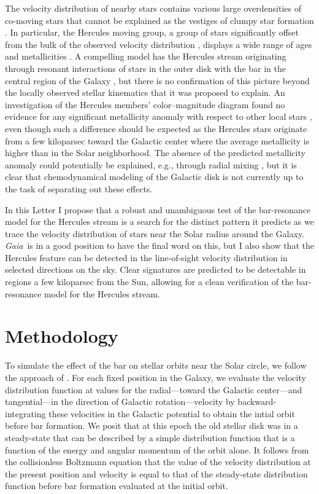 \documentclass[12pt,preprint]{aastex}
\newcommand{\eg}{e.g.}
\newcommand{\Gaia}{\emph{Gaia}}
\begin{document}
The velocity distribution of nearby stars contains various large
overdensities of co-moving stars that cannot be explained as the
vestiges of clumpy star formation \citep[\eg,][]{Bovy10a}. In
particular, the Hercules moving group, a group of stars significantly
offset from the bulk of the observed velocity distribution
\citep[\eg,][see \figurename~\ref{fig:obs}]{Dehnen98b,Bovy09a},
displays a wide range of ages and metallicities
\citep{Blaauw70a,raboud98a,caloi99a,Bensby07a,Bovy10a}. A compelling
model has the Hercules stream originating through resonant
interactions of stars in the outer disk with the bar in the central
region of the Galaxy \citep{dehnen00a,fux01a}, but there is no
confirmation of this picture beyond the locally observed stellar
kinematics that it was proposed to explain. An investigation of the
Hercules members' color--magnitude diagram found no evidence for any
significant metallicity anomaly with respect to other local stars
\citep{Bovy10a}, even though such a difference should be expected as
the Hercules stars originate from a few kiloparsec toward the Galactic
center where the average metallicity is higher than in the Solar
neighborhood. The absence of the predicted metallicity anomaly could
potentially be explained, \eg, through radial mixing
\citep{sellwood02a}, but it is clear that chemodynamical modeling of
the Galactic disk is not currently up to the task of separating out
these effects.

In this Letter I propose that a robust and unambiguous test of the
bar-resonance model for the Hercules stream is a search for the
distinct pattern it predicts as we trace the velocity distribution of
stars near the Solar radius around the Galaxy. \Gaia\ is in a good
position to have the final word on this, but I also show that the
Hercules feature can be detected in the line-of-sight velocity
distribution in selected directions on the sky. Clear signatures are
predicted to be detectable in regions a few kiloparsec from the Sun,
allowing for a clean verification of the bar-resonance model for the
Hercules stream.


\section{Methodology}\label{sec:method}

To simulate the effect of the bar on stellar orbits near the Solar
circle, we follow the approach of \citet{dehnen00a}. For each fixed
position in the Galaxy, we evaluate the velocity distribution function
at values for the radial---toward the Galactic center---and
tangential---in the direction of Galactic rotation---velocity by
backward-integrating these velocities in the Galactic potential to
obtain the intial orbit before bar formation. We posit that at this
epoch the old stellar disk was in a steady-state that can be described
by a simple distribution function that is a function of the energy and
angular momentum of the orbit alone. It follows from the collisionless
Boltzmann equation that the value of the velocity distribution at the
present position and velocity is equal to that of the steady-state
distribution function before bar formation evaluated at the initial
orbit.
\end{document}
